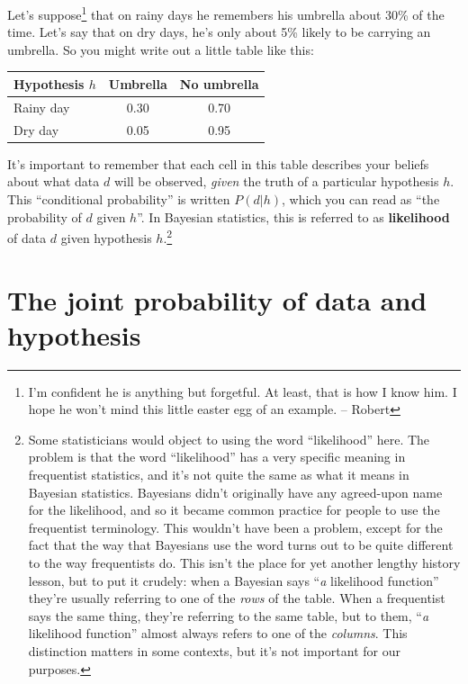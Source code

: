 \documentclass[
]{book}
\theoremstyle{definition}
\theoremstyle{definition}
\theoremstyle{definition}
\theoremstyle{definition}
\theoremstyle{remark}
\begin{document}
Let's suppose\footnote{I'm confident he is anything but forgetful. At least, that is how I know him. I hope he won't mind this little easter egg of an example. -- Robert} that on rainy days he remembers his umbrella about 30\% of the time. Let's say that on dry days, he's only about 5\% likely to be carrying an umbrella. So you might write out a little table like this:

\begin{longtable}[]{@{}lcc@{}}
\toprule()
Hypothesis \(h\) & Umbrella & No umbrella \\
\midrule()
\endhead
Rainy day & 0.30 & 0.70 \\
Dry day & 0.05 & 0.95 \\
\bottomrule()
\end{longtable}

It's important to remember that each cell in this table describes your beliefs about what data \(d\) will be observed, \emph{given} the truth of a particular hypothesis \(h\). This ``conditional probability'' is written \(P(d|h)\), which you can read as ``the probability of \(d\) given \(h\)''. In Bayesian statistics, this is referred to as \textbf{likelihood} of data \(d\) given hypothesis \(h\).\footnote{Some statisticians would object to using the word ``likelihood'' here. The problem is that the word ``likelihood'' has a very specific meaning in frequentist statistics, and it's not quite the same as what it means in Bayesian statistics. Bayesians didn't originally have any agreed-upon name for the likelihood, and so it became common practice for people to use the frequentist terminology. This wouldn't have been a problem, except for the fact that the way that Bayesians use the word turns out to be quite different to the way frequentists do. This isn't the place for yet another lengthy history lesson, but to put it crudely: when a Bayesian says ``\emph{a} likelihood function'' they're usually referring to one of the \emph{rows} of the table. When a frequentist says the same thing, they're referring to the same table, but to them, ``\emph{a} likelihood function'' almost always refers to one of the \emph{columns}. This distinction matters in some contexts, but it's not important for our purposes.}

\hypertarget{the-joint-probability-of-data-and-hypothesis}{%
\section{The joint probability of data and hypothesis}\label{the-joint-probability-of-data-and-hypothesis}}
\end{document}
